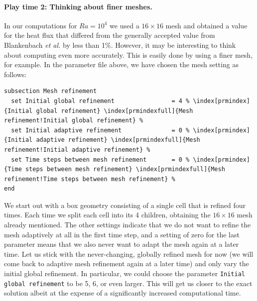 \documentclass{article}
\begin{document}
\paragraph{Play time 2: Thinking about finer meshes.}
In our computations for $Ra=10^4$ we used a $16\times 16$ mesh and obtained a
value for the heat flux that differed from the generally accepted value from
Blankenbach \textit{et al.} \cite{BBC89} by less than 1\%. However, it may be
interesting to think about computing even more accurately. This is easily done
by using a finer mesh, for example. In the parameter file above, we have chosen
the mesh setting as follows:
\begin{lstlisting}[frame=single,language=prmfile,escapechar=\%]
subsection Mesh refinement
  set Initial global refinement                = 4 % \index[prmindex]{Initial global refinement} \index[prmindexfull]{Mesh refinement!Initial global refinement} %
  set Initial adaptive refinement              = 0 % \index[prmindex]{Initial adaptive refinement} \index[prmindexfull]{Mesh refinement!Initial adaptive refinement} %
  set Time steps between mesh refinement       = 0 % \index[prmindex]{Time steps between mesh refinement} \index[prmindexfull]{Mesh refinement!Time steps between mesh refinement} %
end
\end{lstlisting}
We start out with a box geometry consisting of a single cell that is refined
four times. Each time we split each cell into its 4 children, obtaining the
$16\times 16$ mesh already mentioned. The other settings indicate that we do not
want to refine the mesh adaptively at all in the first time step, and a setting
of zero for the last parameter means that we also never want to adapt the mesh
again at a later time. Let us stick with the never-changing, globally refined
mesh for now (we will come back to adaptive mesh refinement again at a later
time) and only vary the initial global refinement. In particular, we could
choose the parameter \texttt{Initial global refinement} to be 5, 6, or even
larger. This will get us closer to the exact solution albeit at the expense of a
significantly increased computational time.
\end{document}
